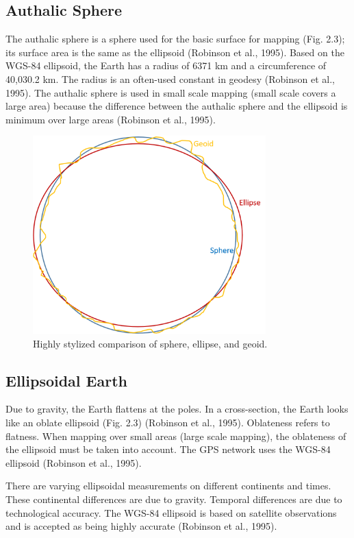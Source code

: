 \documentclass[a4paper , 12pt]{book}
\begin{document}
\subsection{Authalic Sphere}

The authalic sphere is a sphere used for the basic surface for mapping (Fig. 2.3); its surface area is the same as the ellipsoid (Robinson et al., 1995). Based on the WGS-84 ellipsoid, the Earth has a radius of 6371 km and a circumference of 40,030.2 km. The radius is an often-used constant in geodesy (Robinson et al., 1995). The authalic sphere is used in small scale mapping (small scale covers a large area) because the difference between the authalic sphere and the ellipsoid is minimum over large areas (Robinson et al., 1995).

\begin{figure}[ht]
    \centering
    \includegraphics[width=9cm]{Figures/ch2f3.png}
    \caption{Highly stylized comparison of sphere, ellipse, and geoid.}
\end{figure}

\subsection{Ellipsoidal Earth}

Due to gravity, the Earth flattens at the poles. In a cross-section, the Earth looks like an oblate ellipsoid (Fig. 2.3) (Robinson et al., 1995). Oblateness refers to flatness. When mapping over small areas (large scale mapping), the oblateness of the ellipsoid must be taken into account. The GPS network uses the WGS-84 ellipsoid (Robinson et al., 1995).

There are varying ellipsoidal measurements on different continents and times. These continental differences are due to gravity. Temporal differences are due to technological accuracy. The WGS-84 ellipsoid is based on satellite observations and is accepted as being highly accurate (Robinson et al., 1995).
\end{document}
